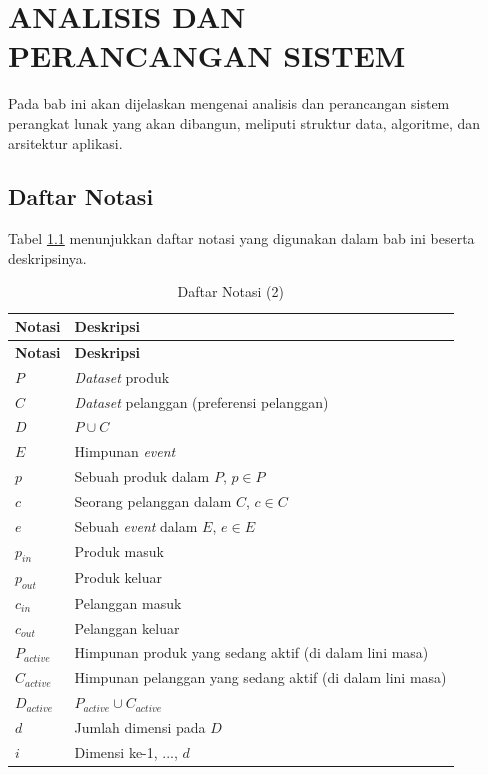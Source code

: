 \chapter{ANALISIS DAN PERANCANGAN SISTEM} \label{chap:analisis-perancangan-sistem}
\tab Pada bab ini akan dijelaskan mengenai analisis dan perancangan sistem perangkat lunak yang akan dibangun, meliputi struktur data, algoritme, dan arsitektur aplikasi. 

\section{Daftar Notasi}
\tab Tabel \ref{tab:daftar-notasi-2} menunjukkan daftar notasi yang digunakan dalam bab ini beserta deskripsinya.

\begin{longtable}{| p{3cm} | p{6cm} |} 
	\caption{Daftar Notasi (2) \label{tab:daftar-notasi-2}}\\
	\hline
	\textbf{Notasi} & \textbf{Deskripsi}\\ \hline
	\endfirsthead
	\hline
	\textbf{Notasi} & \textbf{Deskripsi}\\ \hline
	\endhead
	$P$ & \textit{Dataset} produk\\ \hline
	$C$ & \textit{Dataset} pelanggan (preferensi pelanggan)\\ \hline
	$D$ & $P \cup C$ \\ \hline
	$E$ & Himpunan \textit{event} \\ \hline
	$p$ & Sebuah produk dalam $P$, $p \in P$\\ \hline
	$c$ & Seorang pelanggan dalam $C$, $c \in C$\\ \hline
	$e$ & Sebuah \textit{event} dalam $E$, $e \in E$ \\ \hline
	$p_{in}$ & Produk masuk \\ \hline
	$p_{out}$ & Produk keluar \\ \hline
	$c_{in}$ & Pelanggan masuk \\ \hline
	$c_{out}$ & Pelanggan keluar \\ \hline
	$P_{active}$ & Himpunan produk yang sedang aktif (di dalam lini masa) \\ \hline	
	$C_{active}$ & Himpunan pelanggan yang sedang aktif (di dalam lini masa) \\ \hline	
	$D_{active}$ & $P_{active} \cup C_{active}$ \\ \hline	
	$d$ & Jumlah dimensi pada $D$\\ \hline
	$i$ & Dimensi ke-1, ..., $d$\\ \hline

\end{longtable}
